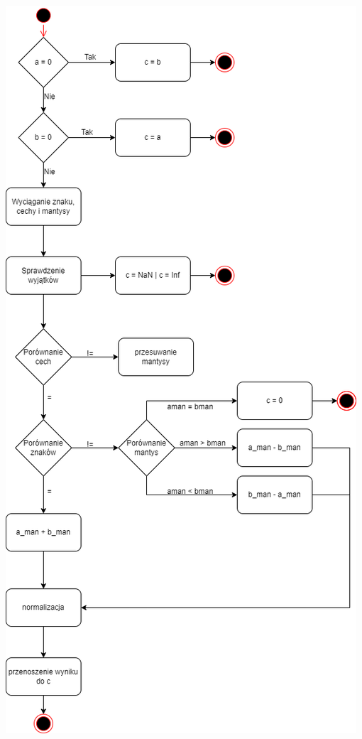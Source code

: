 \documentclass[11pt]{aghdpl}
\begin{document}
\includegraphics[scale=0.55]{addition_uml}
\end{document}
